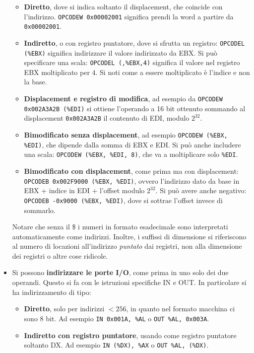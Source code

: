 \documentclass[a4paper,11pt]{article}
\begin{document}
\begin{itemize}
\begin{itemize}
	\item 
		\textbf{Diretto}, dove si indica soltanto il displacement, che coincide con l'indirizzo. \lstinline|OPCODEW 0x00002001| significa prendi la word a partire da \lstinline|0x00002001|.
	\item
		\textbf{Indiretto}, o con registro puntatore, dove si sfrutta un registro: \lstinline|OPCODEL (%EBX)| significa indirizzare il valore indirizzato da EBX. Si può specificare una scala: \lstinline|OPCODEL (,%EBX,4)| significa il valore nel registro EBX moltiplicato per 4.
		Si noti come a essere moltiplicato è l'indice e non la base.
	\item
		\textbf{Displacement e registro di modifica}, ad esempio da \lstinline|OPCODEW 0x002A3A2B (%EDI)| si ottiene l'operando a 16 bit ottenuto sommando al displacement \lstinline|0x002A3A2B| il contenuto di EDI, modulo $2^{32}$.
	\item \textbf{Bimodificato senza displacement}, ad esempio \lstinline|OPCODEW (%EBX, %EDI)|, che dipende dalla somma di EBX e EDI. Si può anche includere una scala: \lstinline|OPCODEW (%EBX, %EDI, 8)|, che va a moltiplicare solo \lstinline|%EDI|.
	\item \textbf{Bimodificato con displacement}, come prima ma con displacement: \lstinline|OPCODEB 0x002F9000 (%EBX, %EDI)|, ovvero l'indirizzo dato da base in EBX + indice in EDI + l'offset modulo $2^{32}$. Si può avere anche negativo: \lstinline|OPCODEB -0x9000 (%EBX, %EDI)|, dove si sottrae l'offset invece di sommarlo.
\end{itemize}

Notare che senza il \$ i numeri in formato esadecimale sono interpretati automaticamente come indirizzi.
Inoltre, i suffissi di dimensione si riferiscono al numero di locazioni all'indirizzo \textit{puntato} dai registri, non alla dimensione dei registri o altre cose ridicole. 

\item
Si possono \textbf{indirizzare le porte I/O}, come prima in uno solo dei due operandi. 
Questo si fa con le istruzioni specifiche IN e OUT.
In particolare si ha indirizzamento di tipo:

\begin{itemize}
	\item \textbf{Diretto}, solo per indirizzi $ < 256 $, in quanto nel formato macchina ci sono 8 bit.
		Ad esempio \lstinline|IN 0x001A, %AL| o \lstinline|OUT %AL, 0x003A|.
	\item \textbf{Indiretto con registro puntatore}, usando come registro puntatore soltanto DX.
		Ad esempio \lstinline|IN (%DX), %AX| o \lstinline|OUT %AL, (%DX)|.
\end{itemize}

\end{itemize}
\end{document}
